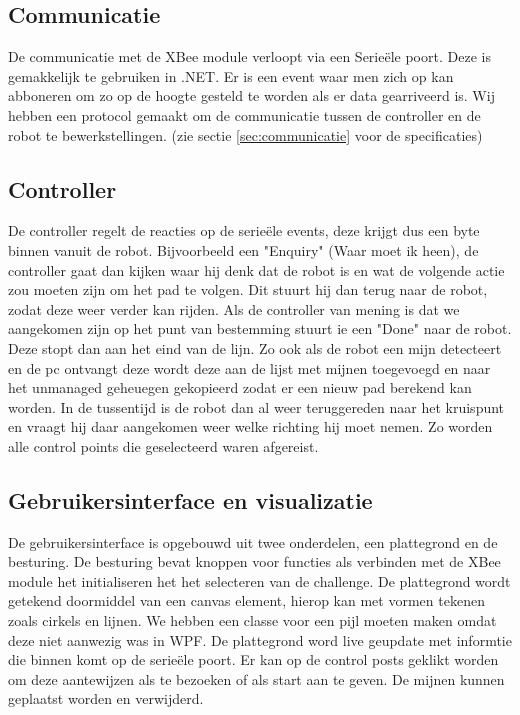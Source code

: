 \documentclass{report}
\begin{document}
\subsection{Communicatie}
De communicatie met de XBee module verloopt via een Serieële poort. Deze is gemakkelijk te gebruiken in .NET. Er is een event waar men zich op kan abboneren om zo op de hoogte gesteld te worden als er data gearriveerd is. Wij hebben een protocol gemaakt om de communicatie tussen de controller en de robot te bewerkstellingen. (zie sectie \ref{sec:communicatie} voor de specificaties)

\subsection{Controller}
De controller regelt de reacties op de serieële events, deze krijgt dus een byte binnen vanuit de robot. Bijvoorbeeld een "Enquiry" (Waar moet ik heen), de controller gaat dan kijken waar hij denk dat de robot is en wat de volgende actie zou moeten zijn om het pad te volgen.
Dit stuurt hij dan terug naar de robot, zodat deze weer verder kan rijden.
Als de controller van mening is dat we aangekomen zijn op het punt van bestemming stuurt ie een "Done" naar de robot. Deze stopt dan aan het eind van de lijn.
Zo ook als de robot een mijn detecteert en de pc ontvangt deze wordt deze aan de lijst met mijnen toegevoegd en naar het unmanaged geheuegen gekopieerd zodat er een nieuw pad berekend kan worden.
In de tussentijd is de robot dan al weer teruggereden naar het kruispunt en vraagt hij daar aangekomen weer welke richting hij moet nemen.
Zo worden alle control points die geselecteerd waren afgereist.
\subsection{Gebruikersinterface en visualizatie}
De gebruikersinterface is opgebouwd uit twee onderdelen, een plattegrond en de besturing.
De besturing bevat knoppen voor functies als verbinden met de XBee module het initialiseren het het selecteren van de challenge.
De plattegrond wordt getekend doormiddel van een canvas element, hierop kan met vormen tekenen zoals cirkels en lijnen. We hebben een classe voor een pijl moeten maken omdat deze niet aanwezig was in WPF.
De plattegrond word live geupdate met informtie die binnen komt op de serieële poort.
Er kan op de control posts geklikt worden om deze aantewijzen als te bezoeken of als start aan te geven.
De mijnen kunnen geplaatst worden en verwijderd.
\end{document}
